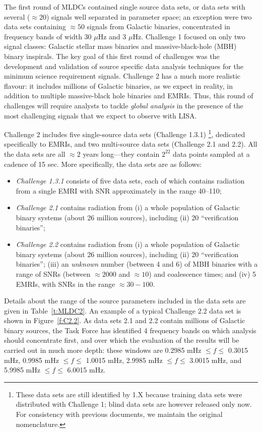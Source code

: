\documentclass[12pt]{iopart}
\begin{document}
The first round of MLDCs contained single source data sets, or data sets with several ($\approx 20$) signals well separated in parameter space; an exception were two data sets containing $\approx 50$ signals from Galactic binaries, concentrated in frequency bands of width 30 $\mu$Hz and 3 $\mu$Hz. Challenge 1 focused on only two signal classes: Galactic stellar mass binaries and massive-black-hole (MBH) binary inspirals. The key goal of this first round of challenges was the development and validation of source specific data analysis techniques for the minimum science requirement signals. Challenge 2 has a much more realistic flavour: it includes millions of Galactic binaries,
as we expect in reality, in addition to multiple massive-black hole binaries and EMRIs. Thus, this round of challenges will require analysts to tackle \emph{global analysis} in the presence of the most challenging signals that we expect to observe with LISA. 

Challenge 2 includes five single-source data sets (Challenge 1.3.1)%
\footnote{These data sets are still identified by 1.X because training data sets were distributed with Challenge 1; blind data sets are however released only now. For consistency with previous documents, we maintain the original nomenclature.},
% 
dedicated specifically to EMRIs, and two multi-source data sets (Challenge 2.1 and 2.2). All the data sets are all $\approx 2$ years long---they contain $2^{22}$ data points sampled at a cadence of 15 sec. More specifically,
the data sets are as follows: 
\begin{itemize}
\item \emph{Challenge 1.3.1} consists of five data sets, each of which contains radiation from a single EMRI with SNR approximately in the range 40--110;
\item \emph{Challenge 2.1} contains radiation from (i) a whole population of Galactic binary systems (about 26 million sources), including (ii) 20 ``verification binaries'';
\item \emph{Challenge 2.2} contains radiation from (i) a whole population of Galactic binary systems (about 26 million sources), including (ii) 20 ``verification binaries''; (iii) an \emph{unknown} number (between 4 and 6) of MBH binaries with a range of SNRs (between $\approx 2000$ and $\approx 10$) and coalescence times; and (iv) 5 EMRIs, with SNRs in the range $\approx 30-100$.
\end{itemize}
Details about the range of the source parameters included in the data sets are given in Table~\ref{t:MLDC2}. An example of a typical Challenge 2.2 data set is shown in Figure~\ref{f:C2.2}. As data sets 2.1 and 2.2 contain millions of Galactic binary sources, the Task Force has identified 4 frequency bands on which analysis should concentrate first, and over which the evaluation of the results will be carried out in much more depth: these windows  are 0.2985 mHz $\le f \le$ 0.3015 mHz, 0.9985 mHz $\le f \le$ 1.0015 mHz, 2.9985 mHz $\le f \le$ 3.0015 mHz, and 5.9985 mHz $\le f \le$ 6.0015 mHz.  
\end{document}
